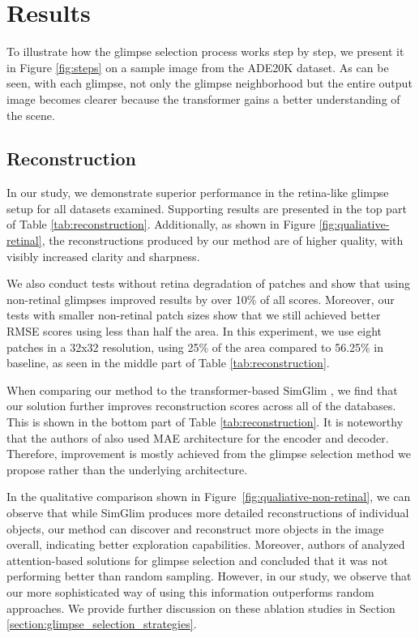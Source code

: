 \documentclass{article}
\begin{document}
\section{Results}

To illustrate how the glimpse selection process works step by step, we present it in Figure \ref{fig:steps} on a sample image from the ADE20K dataset. As can be seen, with each glimpse, not only the glimpse neighborhood but the entire output image becomes clearer because the transformer gains a better understanding of the scene.

\subsection{Reconstruction}


In our study, we demonstrate superior performance in the retina-like glimpse setup for all datasets examined. Supporting results are presented in the top part of Table \ref{tab:reconstruction}. Additionally, as shown in Figure \ref{fig:qualiative-retinal}, the reconstructions produced by our method are of higher quality, with visibly increased clarity and sharpness.

We also conduct tests without retina degradation of patches and show that using non-retinal glimpses improved results by over 10\% of all scores. Moreover, our tests with smaller non-retinal patch sizes show that we still achieved better RMSE scores using less than half the area. In this experiment, we use eight patches in a 32x32 resolution, using 25\% of the area compared to 56.25\% in baseline, as seen in the middle part of Table \ref{tab:reconstruction}.

When comparing our method to the transformer-based SimGlim \cite{Jha2023WACV}, we find that our solution further improves reconstruction scores across all of the databases. This is shown in the bottom part of Table \ref{tab:reconstruction}. It is noteworthy that the authors of \cite{Jha2023WACV} also used MAE \cite{he2022masked} architecture for the encoder and decoder. Therefore, improvement is mostly achieved from the glimpse selection method we propose rather than the underlying architecture.

 In the qualitative comparison shown in Figure~\ref{fig:qualiative-non-retinal}, we can observe that while SimGlim produces more detailed reconstructions of individual objects, our method can discover and reconstruct more objects in the image overall, indicating better exploration capabilities. Moreover, authors of \cite{Jha2023WACV} analyzed attention-based solutions for glimpse selection and concluded that it was not performing better than random sampling. However, in our study, we observe that our more sophisticated way of using this information outperforms random approaches. We provide further discussion on these ablation studies in Section \ref{section:glimpse_selection_strategies}.
\end{document}

